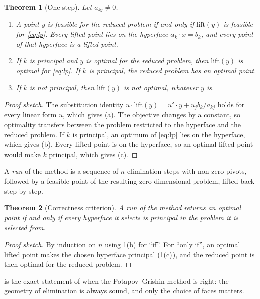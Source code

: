 \documentclass[11pt,a4paper]{article}
\theoremstyle{plain}
\newtheorem{theorem}{Theorem}
\theoremstyle{definition}
\theoremstyle{remark}
\begin{document}
\begin{theorem}[One step]\label{thm:step}
Let $a_{kj}\ne0$.
\begin{enumerate}[label=(\alph*)]
  \item A point $y$ is feasible for the reduced problem if and only if $\mathrm{lift}(y)$ is
  feasible for \eqref{eq:lp}. Every lifted point lies on the hyperface $a_k\cdot x=b_k$, and
  every point of that hyperface is a lifted point.
  \item If $k$ is principal and $y$ is optimal for the reduced problem, then $\mathrm{lift}(y)$
  is optimal for \eqref{eq:lp}. If $k$ is principal, the reduced problem has an optimal point.
  \item If $k$ is not principal, then $\mathrm{lift}(y)$ is not optimal, whatever $y$ is.
\end{enumerate}
\end{theorem}

\begin{proof}[Proof sketch]
The substitution identity $u\cdot\mathrm{lift}(y)=u'\cdot y+u_j b_k/a_{kj}$ holds for every
linear form $u$, which gives (a). The objective changes by a constant, so optimality transfers
between the problem restricted to the hyperface and the reduced problem. If $k$ is principal,
an optimum of \eqref{eq:lp} lies on the hyperface, which gives (b). Every lifted point is on the
hyperface, so an optimal lifted point would make $k$ principal, which gives (c).
\end{proof}

A \emph{run} of the method is a sequence of $n$ elimination steps with non-zero pivots,
followed by a feasible point of the resulting zero-dimensional problem, lifted back step by
step.

\begin{theorem}[Correctness criterion]\label{thm:run}
A run of the method returns an optimal point if and only if every hyperface it selects is
principal in the problem it is selected from.
\end{theorem}

\begin{proof}[Proof sketch]
By induction on $n$ using \cref{thm:step}(b) for ``if''. For ``only if'', an optimal lifted
point makes the chosen hyperface principal (\cref{thm:step}(c)), and the reduced point is then
optimal for the reduced problem.
\end{proof}

 is the exact statement of when the Potapov--Grishin method is right: the
geometry of elimination is always sound, and only the choice of faces matters.
\end{document}

